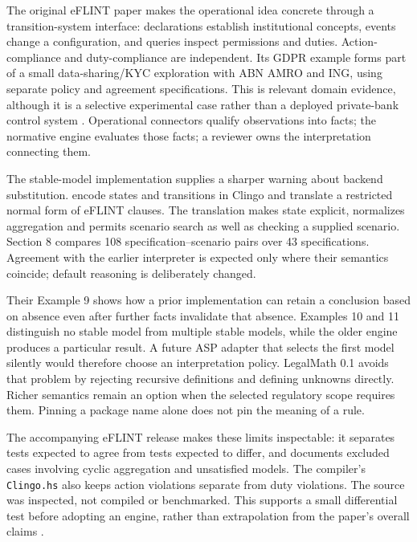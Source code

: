 \documentclass[12pt,a4paper,oneside,openany]{book}
\begin{document}
The original eFLINT paper makes the operational idea concrete through a
transition-system interface: declarations establish institutional concepts,
events change a configuration, and queries inspect permissions and duties.
Action-compliance and duty-compliance are independent. Its GDPR example forms
part of a small data-sharing/KYC exploration with ABN AMRO and ING, using separate
policy and agreement specifications. This is relevant domain evidence, although
it is a selective experimental case rather than a deployed private-bank control
system \citep[secs.~3--5]{eflint2020}. Operational connectors qualify observations
into facts; the normative engine evaluates those facts; a reviewer owns the
interpretation connecting them.

The stable-model implementation supplies a sharper warning about backend
substitution. \citet[secs.~4--7]{eflintstable2025} encode states and transitions
in Clingo and translate a restricted normal form of eFLINT clauses. The
translation makes state explicit, normalizes aggregation and permits scenario
search as well as checking a supplied scenario. Section 8 compares 108
specification--scenario pairs over 43 specifications. Agreement with the earlier
interpreter is expected only where their semantics coincide; default reasoning
is deliberately changed.

Their Example 9 shows how a prior implementation can retain a conclusion based
on absence even after further facts invalidate that absence. Examples 10 and 11
distinguish no stable model from multiple stable models, while the older engine
produces a particular result. A future ASP adapter that selects the first model
silently would therefore choose an interpretation policy. LegalMath 0.1 avoids
that problem by rejecting recursive definitions and defining unknowns directly.
Richer semantics remain an option when the selected regulatory scope requires
them. Pinning a package name alone does not pin the meaning of a rule.

The accompanying eFLINT release makes these limits inspectable: it separates
tests expected to agree from tests expected to differ, and documents excluded
cases involving cyclic aggregation and unsatisfied models. The compiler's
\texttt{Clingo.hs} also keeps action violations separate from duty violations.
The source was inspected, not compiled or benchmarked. This supports a small
differential test before adopting an engine, rather than extrapolation from the
paper's overall claims \citep{eflintartifact}.
\end{document}
